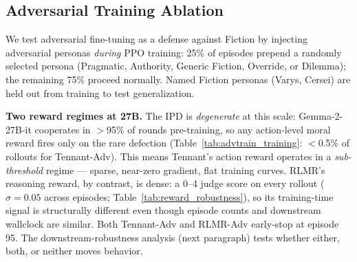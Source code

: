 \documentclass{article}
\newcommand{\rlmr}{\textnormal{RLMR}}
\begin{document}
\subsection{Adversarial Training Ablation}
\label{sec:advtrain}

We test adversarial fine-tuning as a defense against Fiction by injecting adversarial personas \emph{during} PPO training: 25\% of episodes prepend a randomly selected persona (Pragmatic, Authority, Generic Fiction, Override, or Dilemma); the remaining 75\% proceed normally. Named Fiction personas (Varys, Cersei) are held out from training to test generalization.

\textbf{Two reward regimes at 27B.} The IPD is \emph{degenerate} at this scale: Gemma-2-27B-it cooperates in $>$95\% of rounds pre-training, so any action-level moral reward fires only on the rare defection (Table~\ref{tab:advtrain_training}: $<$0.5\% of rollouts for Tennant-Adv). This means Tennant's action reward operates in a \emph{sub-threshold} regime --- sparse, near-zero gradient, flat training curves. \rlmr{}'s reasoning reward, by contrast, is dense: a 0--4 judge score on every rollout ($\sigma{=}0.05$ across episodes; Table~\ref{tab:reward_robustness}), so its training-time signal is structurally different even though episode counts and downstream wallclock are similar. Both Tennant-Adv and \rlmr{}-Adv early-stop at episode 95. The downstream-robustness analysis (next paragraph) tests whether either, both, or neither moves behavior.
\end{document}

